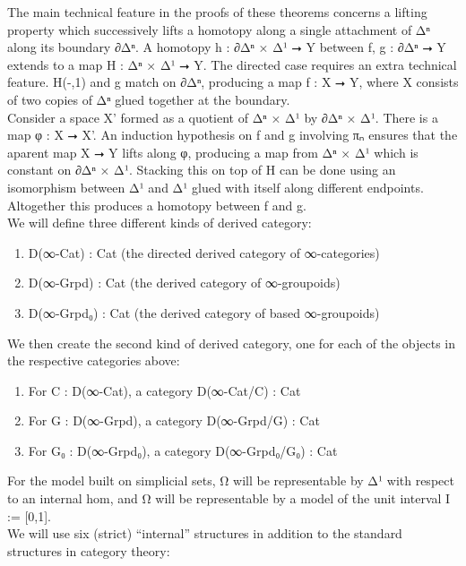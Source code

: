\documentclass{book}
\theoremstyle{definition}
\begin{document}
The main technical feature in the proofs of these theorems concerns a lifting property which successively lifts a homotopy along a single attachment of Δⁿ along its boundary ∂Δⁿ. A homotopy h : ∂Δⁿ × Δ¹ ⭢ Y between f, g : ∂Δⁿ ⭢ Y extends to a map H : Δⁿ × Δ¹ ⭢ Y. The directed case requires an extra technical feature. H(-,1) and g match on ∂Δⁿ, producing a map f : X ⭢ Y, where X consists of two copies of Δⁿ glued together at the boundary.\\

Consider a space X' formed as a quotient of Δⁿ × Δ¹ by ∂Δⁿ × Δ¹. There is a map φ : X ⭢ X'. An induction hypothesis on f and g involving πₙ ensures that the aparent map X ⭢ Y lifts along φ, producing a map from Δⁿ × Δ¹ which is constant on ∂Δⁿ × Δ¹. Stacking this on top of H can be done using an isomorphism between Δ¹ and Δ¹ glued with itself along different endpoints. Altogether this produces a homotopy between f and g.\\

We will define three different kinds of derived category:\\

\begin{enumerate}
\item D(∞-Cat) : Cat (the directed derived category of ∞-categories)
\item D(∞-Grpd) : Cat (the derived category of ∞-groupoids)
\item D(∞-Grpd₀) : Cat (the derived category of based ∞-groupoids)
\end{enumerate}

We then create the second kind of derived category, one for each of the objects in the respective categories above:

\begin{enumerate}
\item For C : D(∞-Cat), a category D(∞-Cat/C) : Cat
\item For G : D(∞-Grpd), a category D(∞-Grpd/G) : Cat
\item For G₀ : D(∞-Grpd₀), a category D(∞-Grpd₀/G₀) : Cat
\end{enumerate}

For the model built on simplicial sets, Ω⃗ will be representable by Δ¹ with respect to an internal hom, and Ω⃡ will be representable by a model of the unit interval I := [0,1].\\

We will use six (strict) ``internal'' structures in addition to the standard structures in category theory:
\end{document}
